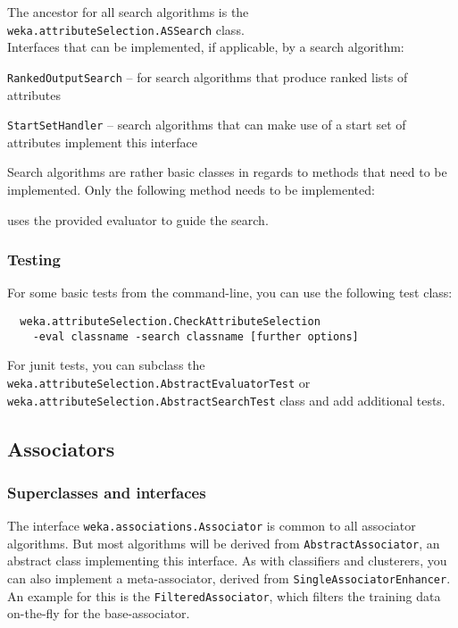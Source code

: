 The ancestor for all search algorithms is the
\texttt{weka.attributeSelection.ASSearch} class. \\

\noindent Interfaces that can be implemented, if applicable, by a search
algorithm:
\begin{tight_itemize}
  \item \texttt{RankedOutputSearch} -- for search algorithms that produce
ranked lists of attributes
  \item \texttt{StartSetHandler} -- search algorithms that can make use of a
start set of attributes implement this interface
\end{tight_itemize}

Search algorithms are rather basic classes in regards to methods that need to
be implemented. Only the following method needs to be implemented:

uses the provided evaluator to guide the search.

\subsubsection*{Testing}
For some basic tests from the command-line, you can use the following test
class:
\begin{verbatim}
  weka.attributeSelection.CheckAttributeSelection
    -eval classname -search classname [further options]
\end{verbatim}
For junit tests, you can subclass the
\texttt{weka.attributeSelection.AbstractEvaluatorTest} or
\texttt{weka.attributeSelection.AbstractSearchTest} class and add additional
tests.


\newpage
\subsection{Associators}
\subsubsection*{Superclasses and interfaces}
The interface \texttt{weka.associations.Associator} is common to all associator
algorithms. But most algorithms will be derived from
\texttt{AbstractAssociator}, an abstract class implementing this interface.
As with classifiers and clusterers, you can also implement a meta-associator,
derived from \texttt{SingleAssociatorEnhancer}. An example for this is the
\texttt{FilteredAssociator}, which filters the training data on-the-fly for the
base-associator.

